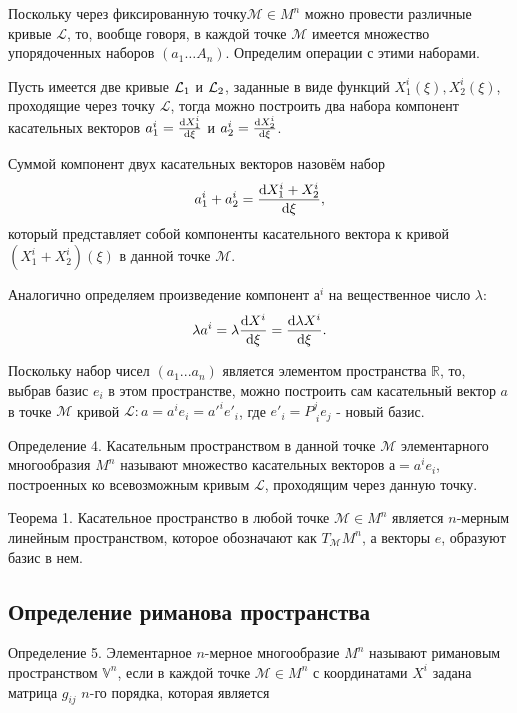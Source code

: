 \documentclass[14pt,a4paper]{extarticle}
\begin{document}
Поскольку через фиксированную точку$\mathcal{M} \in M^n$ можно провести различные кривые $\mathcal{L}$, то, вообще говоря, в каждой точке $\mathcal{M}$ имеется множество упорядоченных наборов $(a_1\dots A_n)$. Определим операции с этими наборами.

Пусть имеется две кривые $\mathcal{L_\textup{1}}$ и $\mathcal{L_\textup{2}}$, заданные в виде функций $X_1^i(\xi), X_2^i(\xi)$, проходящие через точку $\mathcal{L}$, тогда можно построить два набора компонент касательных векторов $a_1^i = \dv{X_1^i}{\xi}$ и $a_2^i = \dv{X_2^i}{\xi}$.

Суммой компонент двух касательных векторов назовём набор
\begin{equation}\label{eq8}
	a_1^i + a_2^i = \dv{X_1^i + X_2^i}{\xi},
\end{equation}
который представляет собой компоненты касательного вектора к кривой $(X_1^i + X_2^i)(\xi)$ в данной точке $\mathcal{M}$.

Аналогично определяем произведение компонент $а^i$ на вещественное число $\lambda$:
\begin{equation}\label{eq9}
	\lambda a^i = \lambda \dv{X^i}{\xi} = \dv{\lambda X^i}{\xi}.
\end{equation}

Поскольку набор чисел $(a_1 ...a_n)$ является элементом пространства $\mathbb{R}$, то, выбрав базис $e_i$ в этом пространстве, можно построить сам касательный вектор $a$ в точке $\mathcal{M}$ кривой $\mathcal{L}: a = a^ie_i = a'^ie'_i$, где $e'_i = P_{\; i}^j e_j$ - новый базис.


Определение 4. Касательным пространством в данной точке $\mathcal{M}$ элементарного многообразия $M^n$ называют множество касательных векторов $а = a^ie_i$, построенных ко всевозможным кривым $\mathcal{L}$, проходящим через данную точку.


Теорема 1. Касательное пространство в любой точке $\mathcal{M} \in M^n$ является $n$-мерным линейным пространством, которое обозначают как $T_{\mathcal{M}}M^n$, а векторы $e$, образуют базис в нем.


\subsection{Определение риманова пространства}
Определение 5. Элементарное $n$-мерное многообразие $M^n$ называют римановым пространством $\mathbb{V}^n$, если в каждой точке $\mathcal{M} \in M^n$ с координатами $X^i$ задана матрица $g_{ij}$ $n$-го порядка, которая является
\end{document}
